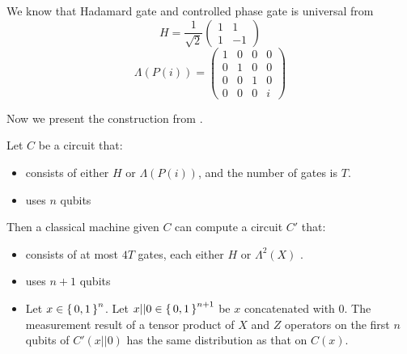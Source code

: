  We know that Hadamard gate and controlled phase gate is universal from \cite{kitaev_1997}
$$H=\frac{1}{\sqrt{2}}\begin{pmatrix}1&1\\1&-1\end{pmatrix}$$
	$$\Lambda(P(i))=\begin{pmatrix}1&0&0&0\\0&1&0&0\\0&0&1&0\\0&0&0&i\end{pmatrix}$$

Now we present the construction from \cite{quant-ph/0301040}.

\begin{thm}
	Let $C$ be a circuit that:
	\begin{itemize}
		\item consists of either $H$ or $\Lambda(P(i))$, and the number of gates is $T$.
		\item uses $n$ qubits
	\end{itemize}
	Then a classical machine given $C$ can compute a circuit $C'$ that:
	\begin{itemize}
		\item consists of at most $4T$ gates, each either $H$ or $\Lambda^2(X)$ .
		\item uses $n+1$ qubits
		\item Let $x\in\set{0,1}^n$. Let $x|| 0\in\set{0,1}^{n+1}$ be $x$ concatenated with $0$.
		The measurement result of a tensor product of $X$ and $Z$ operators on the first $n$ qubits of $C'(x||0)$ has the same distribution as that on $C(x)$.
	\end{itemize}
\end{thm}

